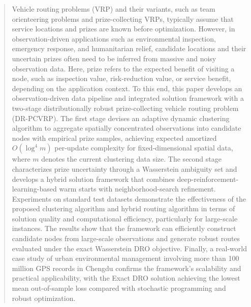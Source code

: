\documentclass[preprint,12pt,authoryear]{elsarticle}
\theoremstyle{definition}
\begin{document}
\begin{frontmatter}
\begin{abstract}
Vehicle routing problems (VRP) and their variants, such as team orienteering problems and prize-collecting VRPs, typically assume that service locations and prizes are known before optimization. However, in observation-driven applications such as environmental inspection, emergency response, and humanitarian relief, candidate locations and their uncertain prizes often need to be inferred from massive and noisy observation data. Here, prize refers to the expected benefit of visiting a node, such as inspection value, risk-reduction value, or service benefit, depending on the application context. 
To this end, this paper develops an observation-driven data pipeline and integrated solution framework with a two-stage distributionally robust prize-collecting vehicle routing problem (DR-PCVRP). 
The first stage devises an adaptive dynamic clustering algorithm to aggregate spatially concentrated observations into candidate nodes with empirical prize samples, achieving expected amortized $O(\log^4 m)$ per-update complexity for fixed-dimensional spatial data, where $m$ denotes the current clustering data size. The second stage characterizes prize uncertainty through a Wasserstein ambiguity set and develops a hybrid solution framework that combines deep-reinforcement-learning-based warm starts with neighborhood-search refinement. Experiments on standard test datasets demonstrate the effectiveness of the proposed clustering algorithm and hybrid routing algorithm in terms of solution quality and computational efficiency, particularly for large-scale instances. The results show that the framework can efficiently construct candidate nodes from large-scale observations and generate robust routes evaluated under the exact Wasserstein DRO objective. Finally, a real-world case study of urban environmental management involving more than 100 million GPS records in Chengdu confirms the framework's scalability and practical applicability, with the Exact DRO solution achieving the lowest mean out-of-sample loss compared with stochastic programming and robust optimization.

\end{abstract}




\end{frontmatter}
\end{document}
